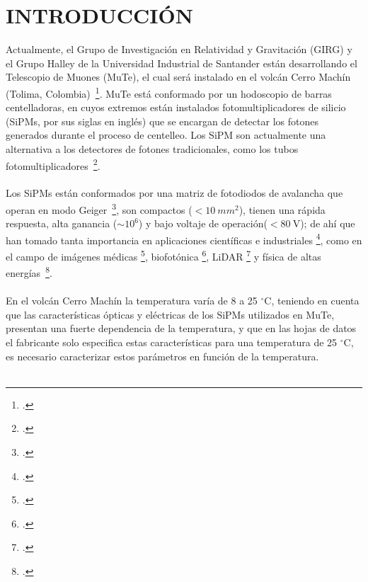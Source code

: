 
\chapter*{INTRODUCCIÓN}
\label{Cap:Introduccion}
Actualmente, el Grupo de Investigación en Relatividad y Gravitación (GIRG) y el Grupo Halley de la Universidad Industrial de Santander están desarrollando el Telescopio de Muones (MuTe), el cual será instalado en el volcán  Cerro Machín (Tolima, Colombia)~\footcite{Mute_oficial}. MuTe está conformado por un hodoscopio de barras centelladoras, en cuyos extremos están instalados fotomultiplicadores de silicio (SiPMs, por sus siglas en inglés) que se encargan de detectar los fotones generados durante el proceso de centelleo. Los  SiPM son actualmente una alternativa a los detectores de fotones tradicionales, como los tubos fotomultiplicadores~\footcite{Intro_SIPM_Sensl}. \\ \\
Los SiPMs están conformados por una matriz de fotodiodos de avalancha que operan en modo Geiger~\footcite{Sipm_S13360_1350CS_datasheet}, son compactos ($< 10~mm^2$), tienen una rápida respuesta, alta ganancia ($\sim 10^6$) y bajo voltaje de operación($ < 80~\mbox{V}$); de ahí que han tomado tanta importancia en aplicaciones científicas e industriales \footcite{Blue_SIPM}, como en el campo de imágenes médicas \footcite{SiPM_PET,SiPM_3D_img}, biofotónica \footcite{SiPM_bio,SiPM_bio2}, LiDAR \footcite{SiPM_Lidar,SiPM_3D_img} y física de altas energías~\footcite{minimute,Mute_oficial}.\\  \\%
 En el volcán Cerro Machín la temperatura varía de 8 a 25 $^{\circ}$C, teniendo en cuenta que las características ópticas y eléctricas de los SiPMs utilizados en MuTe, presentan una fuerte dependencia de la temperatura, y que en las hojas de datos el fabricante solo especifica estas características para una temperatura de 25 $^{\circ}$C, es necesario caracterizar estos parámetros en función de la temperatura. \\ \\  
